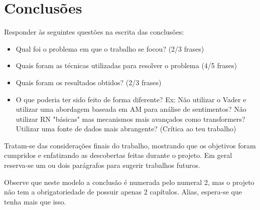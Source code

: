 \section{Conclusões}\label{cap3}

Responder às seguintes questões na escrita das conclusões:

\begin{itemize}
    
    \item Qual foi o problema em que o trabalho se focou? (2/3 frases)
    
    \item Quais foram as técnicas utilizadas para resolver o problema (4/5 frases)
    
    \item Quais foram os resultados obtidos? (2/3 frases)
    
    \item O que poderia ter sido feito de forma diferente? Ex: Não utilizar o Vader e utilizar uma abordagem baseada em AM para análise de sentimentos? Não utilizar RN "básicas" mas mecanismos mais avançados como transformers? Utilizar uma fonte de dados mais abrangente? (Crítica ao teu trabalho)
    
\end{itemize}


Tratam-se das considerações finais do trabalho, mostrando que os objetivos foram cumpridos e enfatizando as descobertas feitas durante o projeto. Em geral reserva-se um ou dois parágrafos para sugerir trabalhos futuros.

Observe que neste modelo a conclusão é numerada pelo numeral 2, mas o projeto não tem a obrigatoriedade de possuir apenas 2 capítulos. Alias, espera-se que tenha mais que isso.

